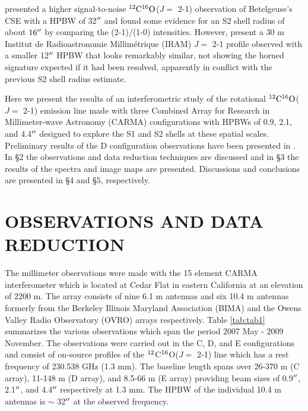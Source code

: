 \documentclass[iop]{emulateapj}
\begin{document}
\cite{1987ApJ...313..400H} presented a higher signal-to-noise $\rm{{}^{12}C^{16}O}$($J=$ 2-1) observation of Betelgeuse's CSE with a HPBW of 32$\mbox{$^{\prime\prime}$}$ and found some evidence for an S2 shell radius of about $16\mbox{$^{\prime\prime}$}$ by comparing the  (2-1)/(1-0) intensities. However, \cite{1994ApJ...424L.127H} present a 30 m Institut de Radioastronomie Millim\'etrique (IRAM) $J=$ 2-1 profile observed with a smaller 12$\mbox{$^{\prime\prime}$}$ HPBW that  looks remarkably similar, not showing the horned signature expected if it had been resolved, apparently in conflict with the previous S2 shell radius estimate.

Here we present the results of an interferometric study of the rotational $\rm{{}^{12}C^{16}O}$($J=$ 2-1) emission line made with three Combined Array for Research in Millimeter-wave Astronomy (CARMA) configurations with HPBWs of 0.9, 2.1, and 4.4$\mbox{$^{\prime\prime}$}$ designed to explore the S1 and S2 shells at these spatial scales.  Preliminary results of the D configuration observations have been presented in \cite{2009AIPC.1094..868H}. In \S2 the observations and data reduction techniques are discussed and in \S3 the results of the spectra and image maps are presented. Discussions and conclusions are presented in \S4 and \S5, respectively.

\section{OBSERVATIONS AND DATA REDUCTION}

The millimeter observations were made with the 15 element CARMA interferometer \citep{2004ASPC..314..768S} which is located at Cedar Flat in eastern California at an elevation of 2200 m. The array consists of nine 6.1 m antennas and six 10.4 m antennas formerly from the Berkeley Illinois Maryland Association (BIMA) and the Owens Valley Radio Observatory (OVRO) arrays respectively. Table \ref{tab:tab1} summarizes the various observations which span the period 2007 May - 2009 November. The observations were carried out in the C, D, and E configurations and consist of on-source profiles of the $\rm{{}^{12}}$C$\rm{{}^{16}}$O($J=$ 2-1) line which has a rest frequency of 230.538 GHz (1.3 mm). The baseline length spans over 26-370 m (C array), 11-148 m (D array), and 8.5-66 m (E array) providing beam sizes of 0.9$\mbox{$^{\prime\prime}$}$, 2.1$\mbox{$^{\prime\prime}$}$, and 4.4$\mbox{$^{\prime\prime}$}$ respectively at 1.3 mm. The HPBW of the individual 10.4 m antennas is $\sim$ 32$\mbox{$^{\prime\prime}$}$ at the observed frequency.
\end{document}
